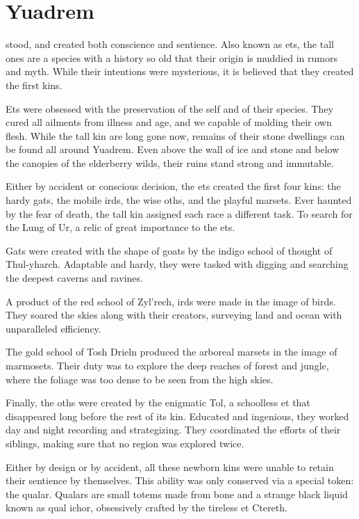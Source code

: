 \chapter{Yuadrem} \label{ch::yuadrem}

stood, and created both conscience and sentience.
Also known as ets, the tall ones are a species with a history so old that their origin is muddied in rumors and myth.
While their intentions were mysterious, it is believed that they created the first kins.

Ets were obsessed with the preservation of the self and of their species.
They cured all ailments from illness and age, and we capable of molding their own flesh.
While the tall kin are long gone now, remains of their stone dwellings can be found all around Yuadrem.
Even above the wall of ice and stone and below the canopies of the elderberry wilds, their ruins stand strong and immutable.

Either by accident or conscious decision, the ets created the first four kins: the hardy gats, the mobile irds, the wise oths, and the playful marsets.
Ever haunted by the fear of death, the tall kin assigned each race a different task.
To search for the Lung of Ur, a relic of great importance to the ets.

Gats were created with the shape of goats by the indigo school of thought of Thul-yharch.
Adaptable and hardy, they were tasked with digging and searching the deepest caverns and ravines.

A product of the red school of Zyl'rech, irds were made in the image of birds.
They soared the skies along with their creators, surveying land and ocean with unparalleled efficiency.

The gold school of Tosh Drieln produced the arboreal marsets in the image of marmosets.
Their duty was to explore the deep reaches of forest and jungle, where the foliage was too dense to be seen from the high skies.

Finally, the oths were created by the enigmatic Tol, a schoolless et that disappeared long before the rest of its kin.
Educated and ingenious, they worked day and night recording and strategizing.
They coordinated the efforts of their siblings, making sure that no region was explored twice.

Either by design or by accident, all these newborn kins were unable to retain their sentience by themselves.
This ability was only conserved via a special token: the qualar.
Qualars are small totems made from bone and a strange black liquid known as qual ichor, obsessively crafted by the tireless et Ctereth.

